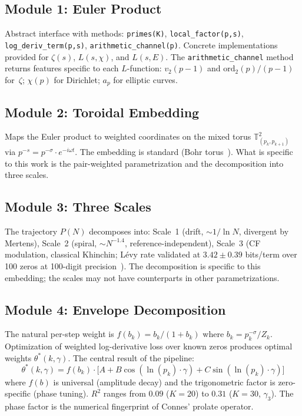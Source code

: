 \documentclass[11pt]{amsart}
\begin{document}
\subsection{Module 1: Euler Product}

Abstract interface with methods: \texttt{primes(K)},
\texttt{local\_factor(p,s)}, \texttt{log\_deriv\_term(p,s)},
\texttt{arithmetic\_channel(p)}. Concrete implementations provided for
$\zeta(s)$, $L(s,\chi)$, and $L(s,E)$. The \texttt{arithmetic\_channel}
method returns features specific to each $L$-function: $v_2(p-1)$ and
$\mathrm{ord}_2(p)/(p-1)$ for~$\zeta$; $\chi(p)$ for Dirichlet; $a_p$ for
elliptic curves.

\subsection{Module 2: Toroidal Embedding}

Maps the Euler product to weighted coordinates on the mixed torus
$\mathbb{T}^2_{(p_k, p_{k+1})}$ via $p^{-s} = p^{-\sigma}\cdot e^{-i\omega
t}$. The embedding is standard (Bohr torus~\cite{Bohr1924}). What is specific to this
work is the pair-weighted parametrization and the decomposition into three
scales.

\subsection{Module 3: Three Scales}

The trajectory $P(N)$ decomposes into: Scale~1 (drift, ${\sim}1/\ln N$,
divergent by Mertens), Scale~2 (spiral, ${\sim}N^{-1.4}$,
reference-independent), Scale~3 (CF modulation, classical Khinchin;
L\'evy rate validated at $3.42 \pm 0.39$ bits/term over 100 zeros at
100-digit precision~\cite{STA2026}). The
decomposition is specific to this embedding; the scales may not have
counterparts in other parametrizations.

\subsection{Module 4: Envelope Decomposition}

The natural per-step weight is $f(b_k) = b_k/(1+b_k)$ where
$b_k = p_k^{-\sigma}/Z_k$. Optimization of weighted log-derivative loss over
known zeros produces optimal weights $\theta^*(k,\gamma)$. The central result
of the pipeline:
\begin{equation}\label{eq:envelope}
  \theta^*(k, \gamma)
  = f(b_k)\cdot\bigl[A + B\cos(\ln(p_k)\cdot\gamma)
                         + C\sin(\ln(p_k)\cdot\gamma)\bigr]
\end{equation}
where $f(b)$ is universal (amplitude decay) and the trigonometric factor is
zero-specific (phase tuning). $R^2$ ranges from $0.09$ ($K=20$) to $0.31$
($K=30$, $\gamma_3$). The phase factor is the numerical fingerprint of
Connes' prolate operator.
\end{document}
